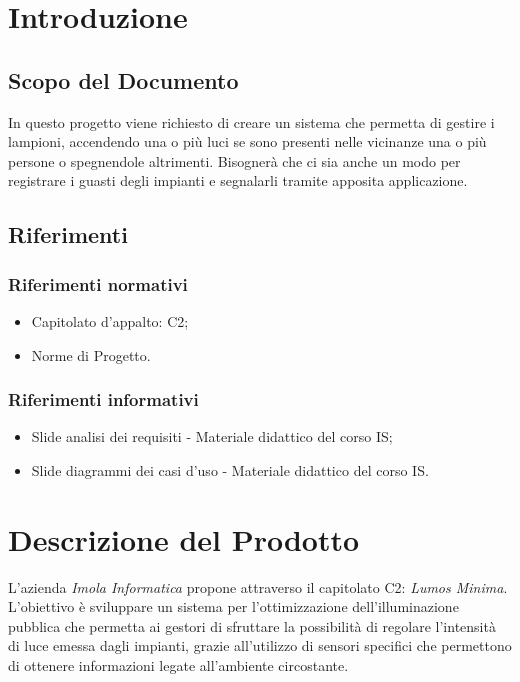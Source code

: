 \documentclass[a4paper, 12pt]{article}
\begin{document}
\makeindexdetails
\makefrontpage \makeversioni
\tableofcontents
\newpage
\clearpage
{} 

\section{Introduzione}
\subsection{Scopo del Documento}
In questo progetto viene richiesto di creare un sistema che permetta di gestire i lampioni, accendendo una o più luci se sono presenti nelle vicinanze una o più persone o spegnendole altrimenti.\newline
Bisognerà che ci sia anche un modo per registrare i guasti degli impianti e segnalarli tramite apposita applicazione.

\subsection{Riferimenti}
\subsubsection*{Riferimenti normativi}
\begin{itemize}
    \item Capitolato d'appalto: C2; 
    \item Norme di Progetto.
\end{itemize}

\subsubsection*{Riferimenti informativi}
\begin{itemize}
    \item Slide analisi dei requisiti - Materiale didattico del corso IS;
    \item Slide diagrammi dei casi d'uso - Materiale didattico del corso IS.
\end{itemize}
\newpage
\section{Descrizione del Prodotto}
L'azienda \textit{Imola Informatica} propone attraverso il capitolato C2:
\textit{Lumos Minima}. L'obiettivo è sviluppare un sistema per l'ottimizzazione
dell'illuminazione pubblica che permetta ai gestori di sfruttare la possibilità
di regolare l'intensità di luce emessa dagli impianti, grazie all'utilizzo di
sensori specifici che permettono di ottenere informazioni legate all'ambiente circostante.
\end{document}
